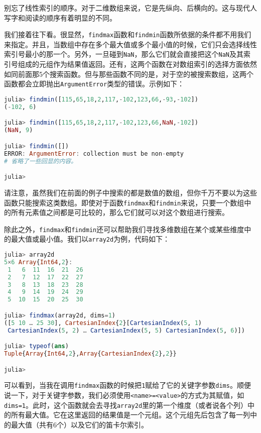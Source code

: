 别忘了线性索引的顺序。对于二维数组来说，它是先纵向、后横向的。这与现代人写字和阅读的顺序有着明显的不同。

我们接着往下看。很显然，\verb|findmax|函数和\verb|findmin|函数所依据的条件都不用我们来指定。并且，当数组中存在多个最大值或多个最小值的时候，它们只会选择线性索引号最小的那一个。另外，一旦碰到\verb|NaN|，那么它们就会直接把这个\verb|NaN|及其索引号组成的元组作为结果值返回。还有，这两个函数在对数组索引的选择方面依然如同前面那5个搜索函数。但与那些函数不同的是，对于空的被搜索数组，这两个函数都会立即抛出\verb|ArgumentError|类型的错误。示例如下：

\begin{lstlisting}[language=julia]
julia> findmin([115,65,18,2,117,-102,123,66,-93,-102])
(-102, 6)

julia> findmin([115,65,18,2,117,-102,123,66,NaN,-102])
(NaN, 9)

julia> findmin([])
ERROR: ArgumentError: collection must be non-empty
# 省略了一些回显的内容。

julia> 
\end{lstlisting}

请注意，虽然我们在前面的例子中搜索的都是数值的数组，但你千万不要以为这些函数只能搜索这类数组。即使对于函数\verb|findmax|和\verb|findmin|来说，只要一个数组中的所有元素值之间都是可比较的，那么它们就可以对这个数组进行搜索。

除此之外，\verb|findmax|和\verb|findmin|还可以帮助我们寻找多维数组在某个或某些维度中的最大值或最小值。我们以\verb|array2d|为例，代码如下：

\begin{lstlisting}[language=julia]
julia> array2d
5×6 Array{Int64,2}:
 1   6  11  16  21  26
 2   7  12  17  22  27
 3   8  13  18  23  28
 4   9  14  19  24  29
 5  10  15  20  25  30

julia> findmax(array2d, dims=1)
([5 10 … 25 30], CartesianIndex{2}[CartesianIndex(5, 1)
 CartesianIndex(5, 2) … CartesianIndex(5, 5) CartesianIndex(5, 6)])

julia> typeof(ans)
Tuple{Array{Int64,2},Array{CartesianIndex{2},2}}

julia> 
\end{lstlisting}

可以看到，当我在调用\verb|findmax|函数的时候把\verb|1|赋给了它的关键字参数\verb|dims|。顺便说一下，对于关键字参数，我们必须使用\verb|<name>=<value>|的方式为其赋值，如\verb|dims=1|。此时，这个函数就会去寻找\verb|array2d|里的第一个维度（或者说各个列）中的所有最大值。它在这里返回的结果值是一个元组。这个元组先后包含了每一列中的最大值（共有6个）以及它们的笛卡尔索引。

